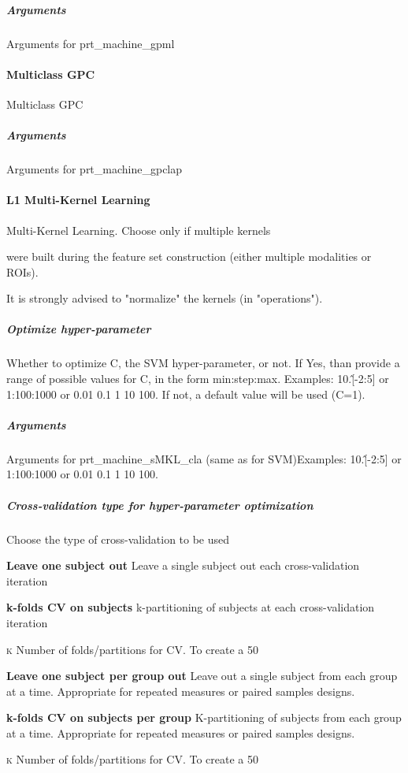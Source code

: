 \subparagraph{Arguments}
Arguments for prt\_machine\_gpml


\paragraph{Multiclass GPC}
Multiclass GPC


\subparagraph{Arguments}
Arguments for prt\_machine\_gpclap


\paragraph{L1 Multi-Kernel Learning}
Multi-Kernel Learning. Choose only if multiple kernels 

were built during the feature set construction (either multiple modalities or ROIs). 

It is strongly advised to "normalize" the kernels (in "operations").


\subparagraph{Optimize hyper-parameter}
Whether to optimize C, the SVM hyper-parameter, or not. If Yes, than provide a range of possible values for C, in the form min:step:max. Examples: 10.\^[-2:5] or 1:100:1000 or 0.01 0.1 1 10 100. If not, a default value will be used (C=1).


\subparagraph{Arguments}
Arguments for prt\_machine\_sMKL\_cla (same as for SVM)Examples: 10.\^[-2:5] or 1:100:1000 or 0.01 0.1 1 10 100.


\subparagraph{Cross-validation type for hyper-parameter optimization}
Choose the type of cross-validation to be used


\textbf{Leave one subject out}
Leave a single subject out each cross-validation iteration


\textbf{k-folds CV on subjects}
k-partitioning of subjects at each cross-validation iteration


\textsc{k}
Number of folds/partitions for CV. To create a 50%


\textbf{Leave one subject per group out}
Leave out a single subject from each group at a time. Appropriate for repeated measures or paired samples designs.


\textbf{k-folds CV on subjects per group}
K-partitioning of subjects from each group at a time. Appropriate for repeated measures or paired samples designs.


\textsc{k}
Number of folds/partitions for CV. To create a 50%


